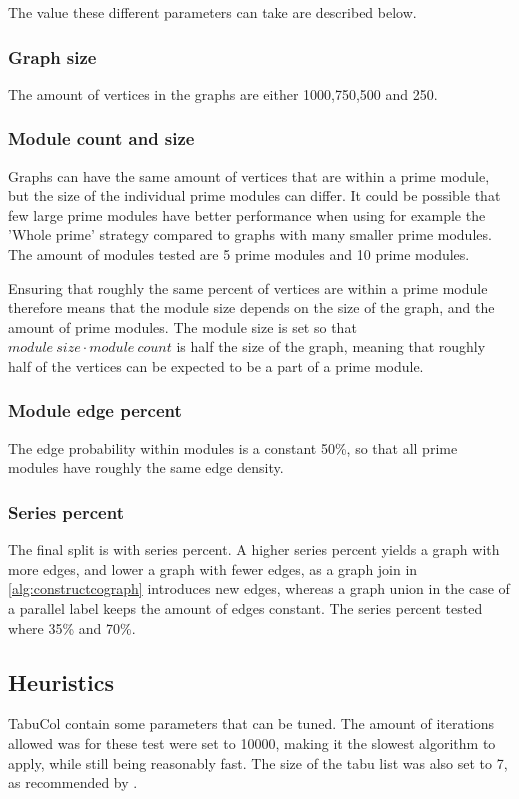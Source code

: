 \documentclass[a4paper]{article}
\begin{document}
The value these different parameters can take are described below.
\subsubsection{Graph size}

The amount of vertices in the graphs are either 1000,750,500 and 250.

\subsubsection{Module count and size}

Graphs can have the same amount of vertices that are within a prime module,
but the size of the individual prime modules can differ. It could be possible that
few large prime modules have better performance when using for example the
'Whole prime' strategy compared to graphs with many smaller prime modules.
The amount of modules tested are 5 prime modules and 10 prime modules.

Ensuring that roughly the same percent of vertices are within a prime module
therefore means that the module size depends on the size of the graph, and the
amount of prime modules. The module size is set so that $module\ size \cdot
module\ count$ is half the size of the graph, meaning that roughly half of the
vertices can be expected to be a part of a prime module.

\subsubsection{Module edge percent}
The edge probability within modules is a  constant 50\%, so that all
prime modules have roughly the same edge density. 

\subsubsection{Series percent}
The final split is with series percent. A higher series percent yields a graph
with more edges, and lower a graph with fewer  edges, as a graph join in
\autoref{alg:constructcograph} introduces new edges, whereas a graph union in the
case of a parallel label keeps the amount of edges constant. The series percent
tested where 35\% and 70\%.

\subsection{Heuristics}
TabuCol contain some parameters that can be tuned. The amount of
iterations allowed was for these test were set to 10000, making it the slowest
algorithm to apply, while still being reasonably fast. The size of the tabu list 
was also set to 7, as recommended by \cite{1990}.
\end{document}
